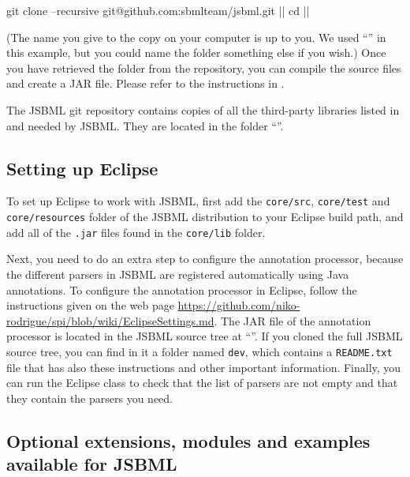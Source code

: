\newcommand{\dirname}{\code{\emph{\bfseries\color{winered}jsbml}}\xspace}

\begin{example}[style=bash, title={Downloading the latest JSBML 
    sources from the JSBML project's GitHub repository.}]
git clone --recursive git@github.com:sbmlteam/jsbml.git |\dirname|
cd |\dirname|
\end{example}

(The name you give to the copy on your computer is up to you.  We used
``\dirname'' in this example, but you could name the folder something else
if you wish.)  Once you have retrieved the folder from the
repository, you can compile the source files and create a JAR file.  Please
refer to the instructions in .

The JSBML git repository contains copies of all the third-party libraries
listed in  and needed by JSBML.  They are
located in the folder ``\dirname''.


\subsection{Setting up Eclipse}
\label{sec:SettingUpEclipse}

To set up Eclipse to work with JSBML, first add the \texttt{core/src},
\texttt{core/test} and \texttt{core/resources} folder of the JSBML distribution to your
Eclipse build path, and add all of the \texttt{.jar} files found in the
\texttt{core/lib} folder.

Next, you need to do an extra step to configure the annotation processor,
because the different parsers in JSBML are registered automatically using
Java annotations.  To configure the annotation processor in Eclipse, follow
the instructions given on the web page
\url{https://github.com/niko-rodrigue/spi/blob/wiki/EclipseSettings.md}.
 The JAR file of the annotation processor is located in the JSBML source tree at
 ``\dirname''. If you cloned
the full JSBML source tree, you can find in it a folder named \texttt{dev}, which 
contains a \texttt{README.txt} file that has also these instructions and other
important information.
Finally, you can run the Eclipse  class to check that the list of
parsers are not empty and that they contain the parsers you need.


\subsection{Optional extensions, modules and examples available for JSBML}
\label{sec:dependencies}

